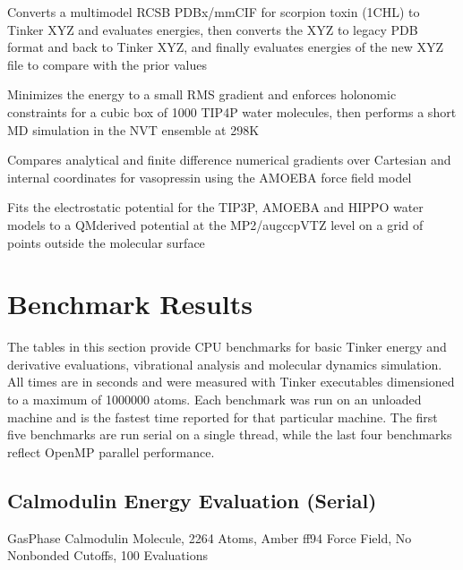 \documentclass[letterpaper,11pt,english]{sphinxmanual}
\begin{document}
\sphinxAtStartPar
{}

\sphinxAtStartPar
Converts a multi\sphinxhyphen{}model RCSB PDBx/mmCIF for scorpion toxin (1CHL) to Tinker XYZ and evaluates energies, then converts the XYZ to legacy PDB format and back to Tinker XYZ, and finally evaluates energies of the new XYZ file to compare with the prior values

\sphinxAtStartPar
{}

\sphinxAtStartPar
Minimizes the energy to a small RMS gradient and enforces holonomic constraints for a cubic box of 1000 TIP4P water molecules, then performs a short MD simulation in the NVT ensemble at 298K

\sphinxAtStartPar
{}

\sphinxAtStartPar
Compares analytical and finite difference numerical gradients over Cartesian and internal coordinates for vasopressin using the AMOEBA force field model

\sphinxAtStartPar
{}

\sphinxAtStartPar
Fits the electrostatic potential for the TIP3P, AMOEBA and HIPPO water models to a QM\sphinxhyphen{}derived potential at the MP2/aug\sphinxhyphen{}cc\sphinxhyphen{}pVTZ level on a grid of points outside the molecular surface

\sphinxstepscope


\chapter{Benchmark Results}
\label{\detokenize{text/benchmarks:benchmark-results}}\label{\detokenize{text/benchmarks::doc}}
\sphinxAtStartPar
The tables in this section provide CPU benchmarks for basic Tinker energy and derivative evaluations, vibrational analysis and molecular dynamics simulation. All times are in seconds and were measured with Tinker executables dimensioned to a maximum of 1000000 atoms. Each benchmark was run on an unloaded machine and is the fastest time reported for that particular machine. The first five benchmarks are run serial on a single thread, while the last four benchmarks reflect OpenMP parallel performance.


\section{Calmodulin Energy Evaluation (Serial)}
\label{\detokenize{text/benchmarks:calmodulin-energy-evaluation-serial}}
\sphinxAtStartPar
Gas\sphinxhyphen{}Phase Calmodulin Molecule, 2264 Atoms, Amber ff94 Force Field, No Nonbonded Cutoffs, 100 Evaluations
\end{document}
